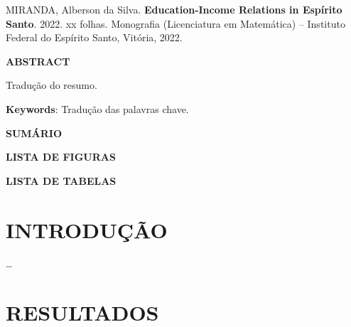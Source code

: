 \documentclass[
  12pt,
  letterpaper,
  DIV=11,
  numbers=noendperiod]{scrartcl}
\newcommand{\nome}{Alberson da Silva}
\newcommand{\sobrenome}{Miranda}
\newcommand{\tituloingles}{Education-Income Relations in Espírito Santo}
\newcommand{\universidade}{Instituto Federal do Espírito Santo}
\newcommand{\curso}{Licenciatura em Matemática}
\newcommand{\cidade}{Vitória}
\newcommand{\ano}{2022}
\begin{document}
\newpage
\thispagestyle{empty}

\begin{singlespace}
\noindent \MakeUppercase{\sobrenome}, \nome. \textbf{\tituloingles}. \ano. xx folhas. Monografia (\curso) -- \universidade, \cidade, \ano.

\vspace{1pc}
\begin{center}
\textbf{ABSTRACT}
\end{center}
\vspace{1pc}

\noindent 
Tradução do resumo.

\vspace{2pc}
\noindent
{\textbf{Keywords}:}  Tradução das palavras chave.
\end{singlespace}

\newpage
\thispagestyle{empty}
\begin{flushleft}
\begingroup
\let\clearpage\relax

\newpage
\begin{center}
\MakeUppercase{\textbf{Sumário}}
\end{center}
\begin{center}
\tableofcontents
\end{center}
\end{flushleft}

\newpage
\thispagestyle{empty}
\begin{center}
\MakeUppercase{\textbf{LISTA DE FIGURAS}}
\end{center}
\begin{center}
\listoffigures
\end{center}

\newpage
\begin{center}
\MakeUppercase{\textbf{LISTA DE TABELAS}}
\end{center}
\begin{center}
\listoftables
\end{center}
\thispagestyle{empty}
\endgroup

\newpage

\hypertarget{introduuxe7uxe3o}{%
\section*{INTRODUÇÃO}\label{introduuxe7uxe3o}}

\ldots{}

\hypertarget{resultados}{%
\section{RESULTADOS}\label{resultados}}
\end{document}
